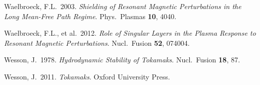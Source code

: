 \documentclass[notitlepage,12pt]{article}
\begin{document}
\begin{description}
\item Waelbroeck, F.L.\ 2003. {\em Shielding of Resonant Magnetic Perturbations in the Long Mean-Free Path Regime}. Phys.\ Plasmas {\bf 10}, 4040.
\item Waelbroeck, F.L., et al.\ 2012. {\em Role of Singular Layers in the Plasma Response to Resonant Magnetic Perturbations}.
Nucl.\ Fusion {\bf 52}, 074004.
\item Wesson, J.\  1978. {\em Hydrodynamic Stability of Tokamaks}. Nucl.\ Fusion {\bf 18}, 87.
\item Wesson, J.\ 2011. {\em Tokamaks}. Oxford University Press. 
\end{description}
\end{document}
